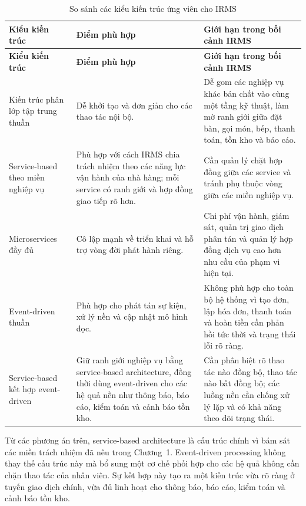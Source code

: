 {\small
\setlength{\LTleft}{0pt}
\setlength{\LTright}{0pt}
\setlength{\tabcolsep}{3pt}
\renewcommand{\arraystretch}{1.15}
\begin{longtable}{@{}>{\raggedright\arraybackslash}p{2.85cm} >{\raggedright\arraybackslash}p{4.15cm} >{\raggedright\arraybackslash}p{5.85cm}@{}}
\caption{So sánh các kiểu kiến trúc ứng viên cho IRMS}\label{tab:appendix-architecture-candidates}\\
\toprule
\textbf{Kiểu kiến trúc} & \textbf{Điểm phù hợp} & \textbf{Giới hạn trong bối cảnh IRMS} \\
\midrule
\endfirsthead
\toprule
\textbf{Kiểu kiến trúc} & \textbf{Điểm phù hợp} & \textbf{Giới hạn trong bối cảnh IRMS} \\
\midrule
\endhead
Kiến trúc phân lớp tập trung thuần & Dễ khởi tạo và đơn giản cho các thao tác nội bộ. & Dễ gom các nghiệp vụ khác bản chất vào cùng một tầng kỹ thuật, làm mờ ranh giới giữa đặt bàn, gọi món, bếp, thanh toán, tồn kho và báo cáo. \\
\addlinespace
Service-based theo miền nghiệp vụ & Phù hợp với cách IRMS chia trách nhiệm theo các năng lực vận hành của nhà hàng; mỗi service có ranh giới và hợp đồng giao tiếp rõ hơn. & Cần quản lý chặt hợp đồng giữa các service và tránh phụ thuộc vòng giữa các miền nghiệp vụ. \\
\addlinespace
Microservices đầy đủ & Cô lập mạnh về triển khai và hỗ trợ vòng đời phát hành riêng. & Chi phí vận hành, giám sát, quản trị giao dịch phân tán và quản lý hợp đồng dịch vụ cao hơn nhu cầu của phạm vi hiện tại. \\
\addlinespace
Event-driven thuần & Phù hợp cho phát tán sự kiện, xử lý nền và cập nhật mô hình đọc. & Không phù hợp cho toàn bộ hệ thống vì tạo đơn, lập hóa đơn, thanh toán và hoàn tiền cần phản hồi tức thời và trạng thái lỗi rõ ràng. \\
\addlinespace
Service-based kết hợp event-driven & Giữ ranh giới nghiệp vụ bằng service-based architecture, đồng thời dùng event-driven cho các hệ quả nền như thông báo, báo cáo, kiểm toán và cảnh báo tồn kho. & Cần phân biệt rõ thao tác nào đồng bộ, thao tác nào bất đồng bộ; các luồng nền cần chống xử lý lặp và có khả năng theo dõi trạng thái. \\
\bottomrule
\end{longtable}
\normalsize
}

Từ các phương án trên, service-based architecture là cấu trúc chính vì bám sát các miền trách nhiệm đã nêu trong Chương~1. Event-driven processing không thay thế cấu trúc này mà bổ sung một cơ chế phối hợp cho các hệ quả không cần chặn thao tác của nhân viên. Sự kết hợp này tạo ra một kiến trúc vừa rõ ràng ở tuyến giao dịch chính, vừa đủ linh hoạt cho thông báo, báo cáo, kiểm toán và cảnh báo tồn kho.


